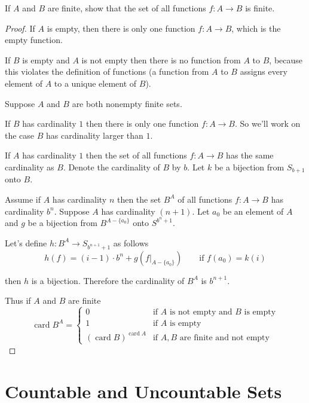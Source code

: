 \begin{exercise}\label{chapter1:section6:exercise7}
    If $A$ and $B$ are finite, show that the set of all functions $f: A\to B$ is finite.
\end{exercise}

\begin{proof}
    If $A$ is empty, then there is only one function $f: A\to B$, which is the empty function.

    If $B$ is empty and $A$ is not empty then there is no function from $A$ to $B$, because this violates the definition of functions (a function from $A$ to $B$ assigns every element of $A$ to a unique element of $B$).

    Suppose $A$ and $B$ are both nonempty finite sets.

    If $B$ has cardinality $1$ then there is only one function $f: A\to B$. So we'll work on the case $B$ has cardinality larger than $1$.

    If $A$ has cardinality $1$ then the set of all functions $f: A\to B$ has the same cardinality as $B$. Denote the cardinality of $B$ by $b$. Let $k$ be a bijection from $S_{b+1}$ onto $B$.

    Assume if $A$ has cardinality $n$ then the set $B^{A}$ of all functions $f: A\to B$ has cardinality $b^{n}$. Suppose $A$ has cardinality $(n + 1)$. Let $a_{0}$ be an element of $A$ and $g$ be a bijection from $B^{A - \{ a_{0} \}}$ onto $S^{b^{n} + 1}$.

    Let's define $h: B^{A}\to S_{b^{n+1} + 1}$ as follows
    \[
        h(f) = (i - 1)\cdot b^{n} + g(f\vert_{A - \{ a_{0} \}}) \qquad\text{if $f(a_{0}) = k(i)$}
    \]

    then $h$ is a bijection. Therefore the cardinality of $B^{A}$ is $b^{n+1}$.

    Thus if $A$ and $B$ are finite
    \[
        \operatorname{card}B^{A} = \begin{cases}
            0                                               & \text{if $A$ is not empty and $B$ is empty} \\
            1                                               & \text{if $A$ is empty}                      \\
            {(\operatorname{card}B)}^{\operatorname{card}A} & \text{if $A, B$ are finite and not empty}
        \end{cases}
    \]
\end{proof}

\section{Countable and Uncountable Sets}

